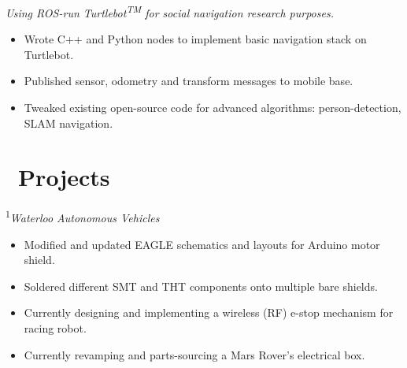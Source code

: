 \documentclass{resume}
\begin{document}
\textit{Using ROS-run Turtlebot\textsuperscript{TM} for social navigation research purposes.}
\begin{itemize}
  \item Wrote C++ and Python nodes to implement basic navigation stack on Turtlebot. 
  \item Published sensor, odometry and transform messages to mobile base.
  \item Tweaked existing open-source code for advanced algorithms: person-detection, SLAM navigation.
\end{itemize}

\begin{comment}
\datedsubsection{\textbf{Mechanical Design Co-op}}{Sep -- Dec 2014}
\company{\textbf{Prodomax Automation Inc.}}{Barrie, ON}
\textit{Designing jigs and fixtures in Solidworks for automotive part-assembly stations.}
\begin{itemize}
  \item Modeled custom tooling in two stations for assembling a vehicle's seat track mechanism. One inserted an anti-collapse spacer and the other stamp-pressed a bushing.
  \item Detailed and ballooned numerous part and assembly drawings extensively.
\end{itemize}
\end{comment}

\section{\faFlask\ Projects}

\textsuperscript{1}\textit{Waterloo Autonomous Vehicles}
\begin{itemize}
  \item Modified and updated EAGLE schematics and layouts for Arduino motor shield. 
  \item Soldered different SMT and THT components onto multiple bare shields.
  \item Currently designing and implementing a wireless (RF) e-stop mechanism for racing robot.
  \item Currently revamping and parts-sourcing a Mars Rover's electrical box. 
\end{itemize}
\end{document}
